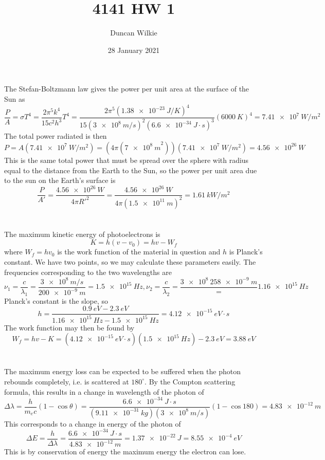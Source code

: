 \documentclass{article}
\title{4141 HW 1}
\author{Duncan Wilkie}
\date{28 January 2021}
\begin{document}
\maketitle

\section{}
The Stefan-Boltzmann law gives the power per unit area at the surface of the Sun as
\[\frac{P}{A}=\sigma T^4=\frac{2\pi^5k^4}{15c^2h^3}T^4=\frac{2\pi^5(\SI{1.38e-23}{J/K})^4}{15(\SI{3e8}{m/s})^2(\SI{6.6e-34}{J\cdot s})^3}(\SI{6000}{K})^4=\SI{7.41e7}{W/m^2}\]
The total power radiated is then
\[P=A(\SI{7.41e7}{W/m^2})=(4\pi(\SI{7e8}{m}^2))(\SI{7.41e7}{W/m^2})=\SI{4.56e26}{W}\]
This is the same total power that must be spread over the sphere with radius equal to the distance from the Earth to the Sun, so the power per unit area due to the sun on the Earth's surface is
\[\frac{P}{A'}=\frac{\SI{4.56e26}{W}}{4\pi R'^2}=\frac{\SI{4.56e26}{W}}{4\pi(\SI{1.5e11}{m})^2}=\SI{1.61}{kW/m^2}\]

\section{}
The maximum kinetic energy of photoelectrons is
\[K=h(v-v_0)=hv-W_f\]
where $W_f=hv_0$ is the work function of the material in question and $h$ is Planck's constant.
We have two points, so we may calculate these parameters easily. The frequencies corresponding to the two wavelengths are
\[\nu_1=\frac{c}{\lambda_1}=\frac{\SI{3e8}{m/s}}{\SI{200e-9}{m}}=\SI{1.5e15}{Hz}, \nu_2=\frac{c}{\lambda_2}=\frac{\SI{3e8}{\SI{258e-9}{m}}}=\SI{1.16e15}{Hz}\]
Planck's constant is the slope, so
\[h=\frac{\SI{0.9}{eV}-\SI{2.3}{eV}}{\SI{1.16e15}{Hz}-\SI{1.5e15}{Hz}}=\SI{4.12e-15}{eV\cdot s}\]
The work function may then be found by
\[W_f=hv-K=(\SI{4.12e-15}{eV\cdot s})(\SI{1.5e15}{Hz})-\SI{2.3}{eV}=\SI{3.88}{eV}\]

\section{}
The maximum energy loss can be expected to be suffered when the photon rebounds completely, i.e. is scattered at $180^\circ$. By the Compton scattering formula, this results in a change in wavelength of the photon of
\[\Delta \lambda=\frac{h}{m_ec}(1-\cos\theta)=\frac{\SI{6.6e-34}{J\cdot s}}{(\SI{9.11e-31}{kg})(\SI{3e8}{m/s})}(1-\cos{180})=\SI{4.83e-12}{m}\]
This corresponds to a change in energy of the photon of
\[\Delta E=\frac{h}{\Delta \lambda}=\frac{\SI{6.6e-34}{J\cdot s}}{\SI{4.83e-12}{m}}=\SI{1.37e-22}{J}=\SI{8.55e-4}{eV}\]
This is by conservation of energy the maximum energy the electron can lose.
\end{document}
